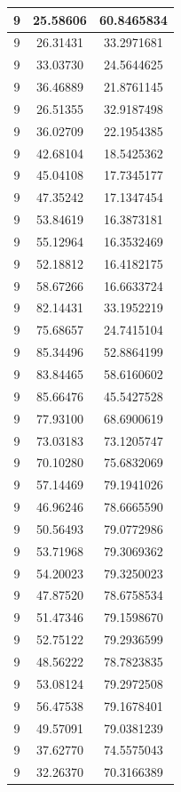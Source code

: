 \documentclass[
]{book}
\begin{document}
\begin{tabular}{c|c|c}
\hline
9 & 25.58606 & 60.8465834\\
\hline
9 & 26.31431 & 33.2971681\\
\hline
9 & 33.03730 & 24.5644625\\
\hline
9 & 36.46889 & 21.8761145\\
\hline
9 & 26.51355 & 32.9187498\\
\hline
9 & 36.02709 & 22.1954385\\
\hline
9 & 42.68104 & 18.5425362\\
\hline
9 & 45.04108 & 17.7345177\\
\hline
9 & 47.35242 & 17.1347454\\
\hline
9 & 53.84619 & 16.3873181\\
\hline
9 & 55.12964 & 16.3532469\\
\hline
9 & 52.18812 & 16.4182175\\
\hline
9 & 58.67266 & 16.6633724\\
\hline
9 & 82.14431 & 33.1952219\\
\hline
9 & 75.68657 & 24.7415104\\
\hline
9 & 85.34496 & 52.8864199\\
\hline
9 & 83.84465 & 58.6160602\\
\hline
9 & 85.66476 & 45.5427528\\
\hline
9 & 77.93100 & 68.6900619\\
\hline
9 & 73.03183 & 73.1205747\\
\hline
9 & 70.10280 & 75.6832069\\
\hline
9 & 57.14469 & 79.1941026\\
\hline
9 & 46.96246 & 78.6665590\\
\hline
9 & 50.56493 & 79.0772986\\
\hline
9 & 53.71968 & 79.3069362\\
\hline
9 & 54.20023 & 79.3250023\\
\hline
9 & 47.87520 & 78.6758534\\
\hline
9 & 51.47346 & 79.1598670\\
\hline
9 & 52.75122 & 79.2936599\\
\hline
9 & 48.56222 & 78.7823835\\
\hline
9 & 53.08124 & 79.2972508\\
\hline
9 & 56.47538 & 79.1678401\\
\hline
9 & 49.57091 & 79.0381239\\
\hline
9 & 37.62770 & 74.5575043\\
\hline
9 & 32.26370 & 70.3166389\\

\end{tabular}
\end{document}
